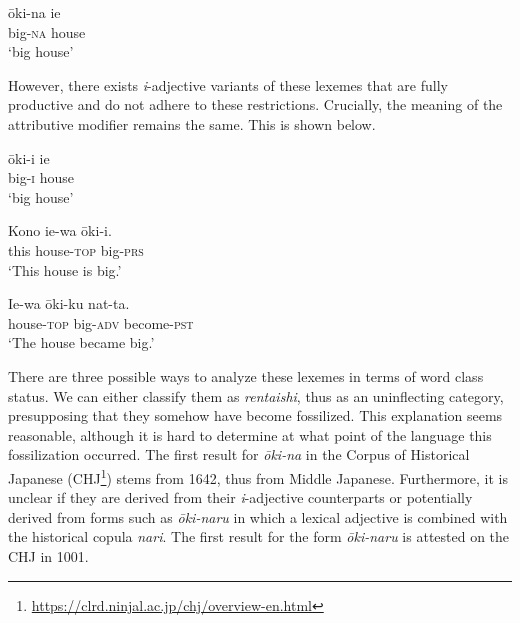 \documentclass[output=paper,colorlinks,citecolor=brown]{langscibook}
\begin{document}
\begin{exe}
	\ex \label{12ex40}
	\begin{xlist}
		\ex 
		\gll ōki-na ie \\
		big-\textsc{na} house \\
		\trans ‘big house’
		
		
	\end{xlist}
\end{exe}


However, there exists \emph{i}-adjective variants of these lexemes that are fully productive and do not adhere to these restrictions. Crucially, the meaning of the attributive modifier remains the same. This is shown below.

\begin{exe}
	\ex \label{12ex41}
	\begin{xlist}
		\ex 
		\gll ōki-i ie \\
		big-\textsc{i} house \\
		\trans ‘big house’
		
		\ex 
		\gll Kono ie-wa ōki-i. \\
		this house-\textsc{top} big-\textsc{prs} \\
		\trans ‘This house is big.’
		
		\ex 
		\gll Ie-wa ōki-ku nat-ta. \\
		house-\textsc{top} big-\textsc{adv} become-\textsc{pst} \\
		\trans ‘The house became big.’
	\end{xlist}
\end{exe}

There are three possible ways to analyze these lexemes in terms of word class status. We can either classify them as \emph{rentaishi}, thus as an uninflecting category, presupposing that they somehow have become fossilized. This explanation seems reasonable, although it is hard to determine at what point of the language this fossilization occurred. The first result for \emph{ōki-na} in the Corpus of Historical Japanese (CHJ\footnote{\url{https://clrd.ninjal.ac.jp/chj/overview-en.html}}) stems from 1642, thus from Middle Japanese. Furthermore, it is unclear if they are derived from their \emph{i}-adjective counterparts or potentially derived from forms such as \emph{ōki-naru} in which a lexical adjective is combined with the historical copula \emph{nari}. The first result for the form \emph{ōki-naru} is attested on the CHJ in 1001.
\end{document}
